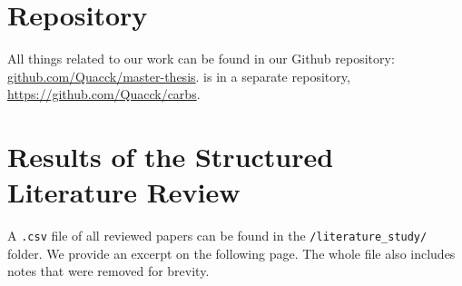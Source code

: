 \appendix
\thispagestyle{plain} %
\section{Repository} \label{appendix:repository}

All things related to our work can be found in our Github repository: \url{github.com/Quacck/master-thesis}.
\programname{} is in a separate repository, \url{https://github.com/Quacck/carbs}.

\section{Results of the Structured Literature Review} \label{appendix:literature_review_results}

A \verb|.csv| file of all reviewed papers can be found in the \verb|/literature_study/| folder.
We provide an excerpt on the following page.
The whole file also includes notes that were removed for brevity.


